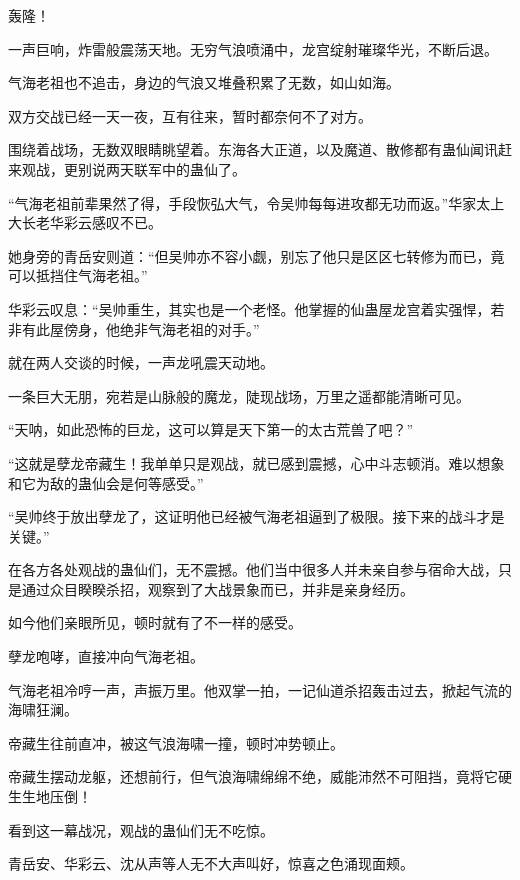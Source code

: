 
\begin{this_body}



轰隆！

一声巨响，炸雷般震荡天地。无穷气浪喷涌中，龙宫绽射璀璨华光，不断后退。

气海老祖也不追击，身边的气浪又堆叠积累了无数，如山如海。

双方交战已经一天一夜，互有往来，暂时都奈何不了对方。

围绕着战场，无数双眼睛眺望着。东海各大正道，以及魔道、散修都有蛊仙闻讯赶来观战，更别说两天联军中的蛊仙了。

“气海老祖前辈果然了得，手段恢弘大气，令吴帅每每进攻都无功而返。”华家太上大长老华彩云感叹不已。

她身旁的青岳安则道：“但吴帅亦不容小觑，别忘了他只是区区七转修为而已，竟可以抵挡住气海老祖。”

华彩云叹息：“吴帅重生，其实也是一个老怪。他掌握的仙蛊屋龙宫着实强悍，若非有此屋傍身，他绝非气海老祖的对手。”

就在两人交谈的时候，一声龙吼震天动地。

一条巨大无朋，宛若是山脉般的魔龙，陡现战场，万里之遥都能清晰可见。

“天呐，如此恐怖的巨龙，这可以算是天下第一的太古荒兽了吧？”

“这就是孽龙帝藏生！我单单只是观战，就已感到震撼，心中斗志顿消。难以想象和它为敌的蛊仙会是何等感受。”

“吴帅终于放出孽龙了，这证明他已经被气海老祖逼到了极限。接下来的战斗才是关键。”

在各方各处观战的蛊仙们，无不震撼。他们当中很多人并未亲自参与宿命大战，只是通过众目睽睽杀招，观察到了大战景象而已，并非是亲身经历。

如今他们亲眼所见，顿时就有了不一样的感受。

孽龙咆哮，直接冲向气海老祖。

气海老祖冷哼一声，声振万里。他双掌一拍，一记仙道杀招轰击过去，掀起气流的海啸狂澜。

帝藏生往前直冲，被这气浪海啸一撞，顿时冲势顿止。

帝藏生摆动龙躯，还想前行，但气浪海啸绵绵不绝，威能沛然不可阻挡，竟将它硬生生地压倒！

看到这一幕战况，观战的蛊仙们无不吃惊。

青岳安、华彩云、沈从声等人无不大声叫好，惊喜之色涌现面颊。


\end{this_body}
